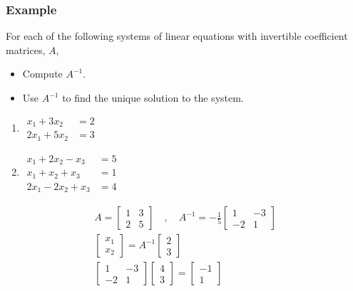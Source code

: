 \documentclass[10pt, oneside]{article}
\begin{document}
\subsubsection{Example}
For each of the following systems of linear equations with invertible coefficient matrices, $A$,
\begin{itemize}
	\item Compute $A^{-1}$.
	\item Use $A^{-1}$ to find the unique solution to the system.
\end{itemize}
\begin{enumerate}
	\item $\begin{array}{ll}
			      x_1 + 3x_2  & = 2 \\
			      2x_1 + 5x_2 & = 3
		      \end{array}$
	\item $\begin{array}{ll}
			      x_1 + 2x_2 - x_3  & = 5 \\
			      x_1 + x_2 + x_3   & = 1 \\
			      2x_1 - 2x_2 + x_3 & = 4
		      \end{array}$
\end{enumerate}

\[
	\begin{split}
		A = \begin{bmatrix} 1 & 3 \\ 2 & 5 \end{bmatrix} \quad , \quad A^{-1} = -\frac{1}{5} \begin{bmatrix} 1 & -3 \\ -2 & 1 \end{bmatrix} \\
		\begin{bmatrix} x_1 \\ x_2 \end{bmatrix} = A^{-1} \begin{bmatrix} 2 \\ 3 \end{bmatrix} \\
		\begin{bmatrix} 1 & -3 \\ -2 & 1 \end{bmatrix} \begin{bmatrix} 4 \\ 3 \end{bmatrix} = \begin{bmatrix} -1 \\ 1 \end{bmatrix}
	\end{split}
\]
\end{document}
